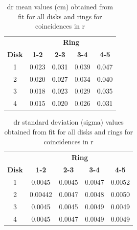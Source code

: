 

\begin{table}[H]
  \centering
  \caption[dr mean values]{dr mean values (cm) obtained from fit for all disks and rings for coincidences in r}
\begin{tabular}{ccccc}
 & \multicolumn{4}{c}{\textbf{Ring}} \\
\textbf{Disk} & \textbf{1-2} & \textbf{2-3} & \textbf{3-4} & \textbf{4-5} \\
\hline
1 & 0.023 & 0.031 & 0.039 & 0.047 \\
2 & 0.020 & 0.027 & 0.034 & 0.040 \\
3 & 0.018 & 0.023 & 0.029 & 0.035 \\
4 & 0.015 & 0.020  & 0.026 & 0.031 \\
\end{tabular}
\label{tab:my_label_55}
\end{table}


\begin{table}[H]
  \centering
  \caption[dr cut values]{dr standard deviation (sigma) values obtained from fit for all disks and rings for coincidences in r}
\begin{tabular}{ccccc}
 & \multicolumn{4}{c}{\textbf{Ring}} \\
\textbf{Disk} & \textbf{1-2} & \textbf{2-3} & \textbf{3-4} & \textbf{4-5} \\
\hline
1 & 0.0045 & 0.0045 & 0.0047 & 0.0052 \\
2 & 0.00442 & 0.0047 & 0.0048 & 0.0050 \\
3 & 0.0045 & 0.0045 & 0.0049 & 0.0049 \\
4 & 0.0045 & 0.0047 & 0.0049 & 0.0049 \\
\end{tabular}
\label{tab:my_label_53}
\end{table}



